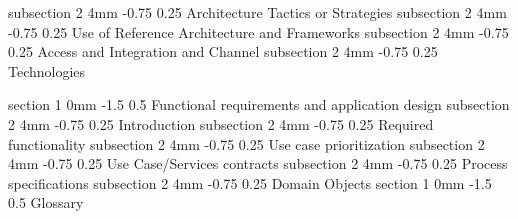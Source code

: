\documentclass[12pt]{article}
\makeatletter
\renewcommand{\section}{\@startsection
   {section}%
   {1}%
   {0mm}%
   {-1.5\baselineskip}%
   {0.5\baselineskip}%
   {\sffamily\bfseries\upshape\normalsize}}%
\renewcommand{\subsection}{\@startsection
   {subsection}%
   {2}%
   {4mm}%
   {-0.75\baselineskip}%
   {0.25\baselineskip}%
   {\rmfamily\normalfont\scshape\normalsize}}%
\makeatother
\begin{document}
                    \subsection{Architecture Tactics or Strategies}
                    \subsection{Use of Reference Architecture and Frameworks }
                    \subsection{Access and Integration and Channel }
					\subsection{Technologies}
                    
                \section{Functional requirements and application design}
                    \subsection{Introduction}
                    \subsection{Required functionality}
                    \subsection{Use case prioritization}
                    \subsection{Use Case/Services contracts}
                    \subsection{Process specifications}
                    \subsection{Domain Objects}
               \section{Glossary}
             
\end{document}
